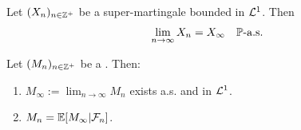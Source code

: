 \begin{theorem}
    Let $(X_n)_{n \in \mathbb Z^+}$ be a super-martingale bounded in $\mathcal{L}^1$. Then
    \[ \lim_{n \to \infty} X_n = X_\infty \quad \mathbb P\text{-a.s.} \]
\end{theorem}

\begin{proposition}
    Let $(M_n)_{n \in \mathbb Z^+}$ be a . Then:
    \begin{enumerate}[label=(\alph*)]
        \item $M_\infty := \lim_{n \to \infty} M_n$ exists a.s. and in $\mathcal{L}^1$.
        \item $M_n = \mathbb E[M_\infty | \mathcal{F}_n]$.
    \end{enumerate}
\end{proposition}

